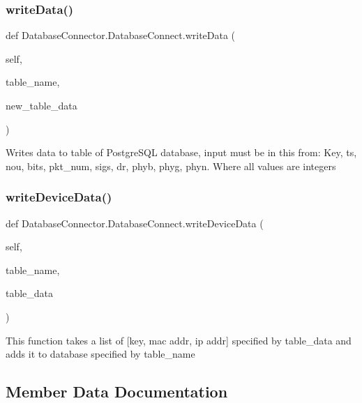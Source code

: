 \subsubsection{\texorpdfstring{write\+Data()}{writeData()}}
{\footnotesize\ttfamily def Database\+Connector.\+Database\+Connect.\+write\+Data (\begin{DoxyParamCaption}\item[{}]{self,  }\item[{}]{table\+\_\+name,  }\item[{}]{new\+\_\+table\+\_\+data }\end{DoxyParamCaption})}

\begin{DoxyVerb}Writes data to table of PostgreSQL database, input must be in this from: Key, ts, nou, bits, pkt_num, sigs, dr, phyb, phyg, phyn. Where all values are integers\end{DoxyVerb}
 \mbox{\label{classDatabaseConnector_1_1DatabaseConnect_af67bc1a7983d83e2df140bc3cec92d84}} 
\subsubsection{\texorpdfstring{write\+Device\+Data()}{writeDeviceData()}}
{\footnotesize\ttfamily def Database\+Connector.\+Database\+Connect.\+write\+Device\+Data (\begin{DoxyParamCaption}\item[{}]{self,  }\item[{}]{table\+\_\+name,  }\item[{}]{table\+\_\+data }\end{DoxyParamCaption})}

\begin{DoxyVerb}This function takes a list of [key, mac addr, ip addr] specified by table_data and adds it to database specified by table_name\end{DoxyVerb}
 

\subsection{Member Data Documentation}
\mbox{\label{classDatabaseConnector_1_1DatabaseConnect_a032674c05648a8ba31c2ef9a1363338e}} 
